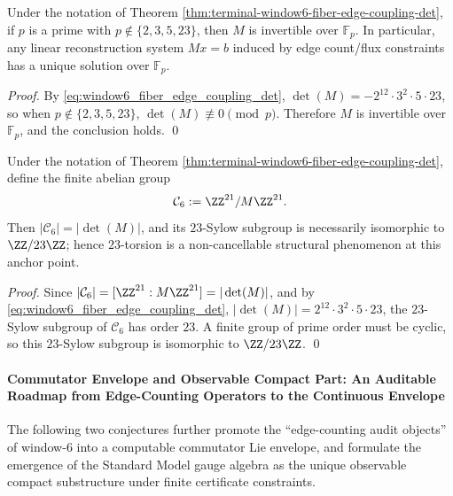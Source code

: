 \begin{corollary}\label{cor:terminal-window6-fiber-edge-coupling-p-adic-window}
Under the notation of Theorem \ref{thm:terminal-window6-fiber-edge-coupling-det}, if \(p\) is a prime with \(p\notin\{2,3,5,23\}\), then \(M\) is invertible over \(\mathbb{F}_p\).
In particular, any linear reconstruction system \(Mx=b\) induced by edge count/flux constraints has a unique solution over \(\mathbb{F}_p\).
\end{corollary}
\begin{proof}
By \eqref{eq:window6_fiber_edge_coupling_det}, \(\det(M)=-2^{12}\cdot 3^{2}\cdot 5\cdot 23\), so when \(p\notin\{2,3,5,23\}\), \(\det(M)\not\equiv 0\pmod p\).
Therefore \(M\) is invertible over \(\mathbb{F}_p\), and the conclusion holds. \qed
\end{proof}

\begin{corollary}\label{cor:terminal-window6-coupling-response-group-23-torsion}
Under the notation of Theorem \ref{thm:terminal-window6-fiber-edge-coupling-det}, define the finite abelian group
\[
\mathcal{C}_6:=\ZZ^{21}/M\ZZ^{21}.
\]
Then \(|\mathcal{C}_6|=|\det(M)|\), and its \(23\)-Sylow subgroup is necessarily isomorphic to \(\ZZ/23\ZZ\);
hence \(23\)-torsion is a non-cancellable structural phenomenon at this anchor point.
\end{corollary}
\begin{proof}
Since \(|\mathcal{C}_6|=[\ZZ^{21}:M\ZZ^{21}]=|\det(M)|\),
and by \eqref{eq:window6_fiber_edge_coupling_det}, \(|\det(M)|=2^{12}\cdot 3^{2}\cdot 5\cdot 23\), the \(23\)-Sylow subgroup of \(\mathcal{C}_6\) has order \(23\).
A finite group of prime order must be cyclic, so this \(23\)-Sylow subgroup is isomorphic to \(\ZZ/23\ZZ\). \qed
\end{proof}

\paragraph{Commutator Envelope and Observable Compact Part: An Auditable Roadmap from Edge-Counting Operators to the Continuous Envelope}
The following two conjectures further promote the ``edge-counting audit objects'' of window-\(6\) into a computable commutator Lie envelope, and formulate the emergence of the Standard Model gauge algebra as the unique observable compact substructure under finite certificate constraints.

